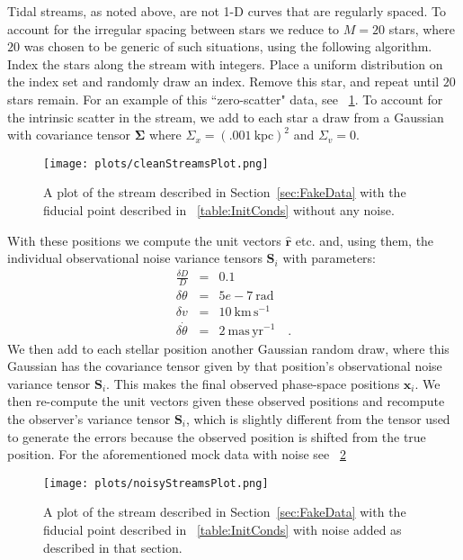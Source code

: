 \documentclass[12pt,preprint]{aastex}
\theoremstyle{plain}
\theoremstyle{definition}
\newcommand{\mtensor}[1]{\boldsymbol{#1}}
\newcommand{\mS}{\mtensor{S}}
\newcommand{\mSigma}{\mtensor{\Sigma}}
\newcommand{\mvector}[1]{\mtensor{#1}}
\renewcommand{\vr}{\mvector{r}}
\newcommand{\vx}{\mvector{x}}
\newcommand{\rhat}{\hat{\vr}}
\newcommand{\unit}[1]{\mathrm{#1}}
\newcommand{\kpc}{\unit{kpc}}
\newcommand{\km}{\unit{km}}
\newcommand{\s}{\unit{s}}
\newcommand{\kmps}{\km\,\s^{-1}}
\newcommand{\rad}{\unit{rad}}
\newcommand{\mas}{\unit{mas}}
\newcommand{\yr}{\unit{yr}}
\newcommand{\maspyr}{\mas\,\yr^{-1}}
\newcommand{\sectionname}{Section}
\begin{document}
Tidal streams, as noted above, are not 1-D curves that are regularly spaced. To
account for the irregular spacing between stars we reduce to $M=20$ stars, where
$20$ was chosen to be generic of such situations, using the following algorithm.
Index the stars along the stream with integers. Place a uniform 
distribution on the index set and randomly draw an index. Remove this star, and 
repeat until $20$ stars remain. For an example of this ``zero-scatter" data, see 
\figurename~\ref{fig:cleanStreamsPlot}. To account for the intrinsic scatter in 
the stream, we add to each star a draw from a Gaussian with covariance tensor 
$\mSigma$ where $\Sigma_x = (.001~\kpc)^2$ and $\Sigma_v = 0$.
\begin{figure}[h]
\begin{center}
\texttt{[image: plots/cleanStreamsPlot.png]}
\caption{A plot of the stream described in \sectionname~\ref{sec:FakeData} with the fiducial point described in \tablename~\ref{table:InitConds} without any noise.}
\label{fig:cleanStreamsPlot}
\end{center}
\end{figure}
With these positions we compute the unit vectors $\rhat$ etc. and, using them, 
the individual observational noise variance tensors $\mS_i$ with parameters:
\begin{eqnarray}\displaystyle
\frac{\delta D}{D} &=& 0.1
\nonumber\\
\delta\theta &=& 5e-7~\rad
\nonumber\\
\delta v &=& 10~\kmps
\nonumber\\
\delta\dot{\theta} &=& 2~\maspyr
\quad.
\end{eqnarray}
We then add to each stellar position another Gaussian random draw, where this Gaussian 
has the covariance tensor given by that position's observational noise variance 
tensor $\mS_i$.  This makes the final observed phase-space positions $\vx_i$.  
We then re-compute the unit vectors given these observed positions and recompute the
observer's variance tensor $\mS_i$, which is slightly different from
the tensor used to generate the errors because the observed position
is shifted from the true position. For the aforementioned mock data with noise
see \figurename~\ref{fig:noisyStreamsPlot} 

\begin{figure}[ht]
\begin{center}
\texttt{[image: plots/noisyStreamsPlot.png]}
\caption{A plot of the stream described in \sectionname~\ref{sec:FakeData} with the fiducial point described in \tablename~\ref{table:InitConds} with noise added as described in that section.}
\label{fig:noisyStreamsPlot}
\end{center}
\end{figure}
\end{document}
